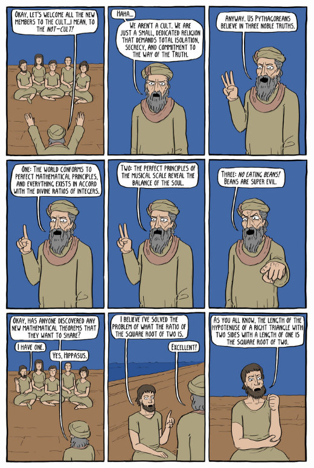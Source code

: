 \documentclass[addpoints]{exam}
\theoremstyle{definition}
\theoremstyle{claim}
\begin{document}
\begin{questions}
  \includegraphics[width=\textwidth]{pyth1}

\end{questions}
\end{document}
